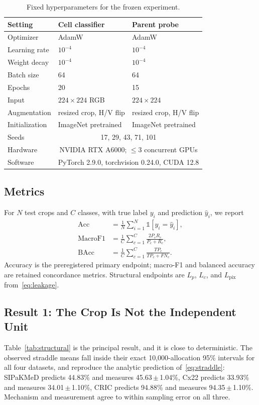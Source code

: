 \documentclass[conference]{IEEEtran}
\newcommand{\meanpm}[2]{#1\,$\pm$\,#2}
\begin{document}
\begin{table}[t]
\caption{Fixed hyperparameters for the frozen experiment.}
\label{tab:hparams}
\centering
\scriptsize
\setlength{\tabcolsep}{3.5pt}
\begin{tabular}{lll}
\toprule
Setting & Cell classifier & Parent probe \\
\midrule
Optimizer & AdamW & AdamW \\
Learning rate & $10^{-4}$ & $10^{-4}$ \\
Weight decay & $10^{-4}$ & $10^{-4}$ \\
Batch size & 64 & 64 \\
Epochs & 20 & 15 \\
Input & $224\times224$ RGB & $224\times224$ \\
Augmentation & resized crop, H/V flip & resized crop, H/V flip \\
Initialization & ImageNet pretrained & ImageNet pretrained \\
Seeds & \multicolumn{2}{c}{17, 29, 43, 71, 101} \\
Hardware & \multicolumn{2}{c}{NVIDIA RTX A6000; $\leq$3 concurrent GPUs} \\
Software & \multicolumn{2}{c}{PyTorch 2.9.0, torchvision 0.24.0, CUDA 12.8} \\
\bottomrule
\end{tabular}
\end{table}

\subsection{Metrics}
For $N$ test crops and $C$ classes, with true label $y_i$ and prediction $\hat y_i$, we report
\begin{align}
\mathrm{Acc}&=\frac{1}{N}\sum_{i=1}^{N}\mathbb{1}[y_i=\hat y_i],\\
\mathrm{MacroF1}&=\frac{1}{C}\sum_{c=1}^{C}\frac{2P_cR_c}{P_c+R_c},\\
\mathrm{BAcc}&=\frac{1}{C}\sum_{c=1}^{C}\frac{TP_c}{TP_c+FN_c}.
\end{align}
Accuracy is the preregistered primary endpoint; macro-F1 and balanced accuracy are retained concordance metrics.
Structural endpoints are $L_p$, $L_c$, and $L_{\mathrm{pix}}$ from~\eqref{eq:leakage}.

\subsection{Result 1: The Crop Is Not the Independent Unit}
Table~\ref{tab:structural} is the principal result, and it is close to deterministic.
The observed straddle means fall inside their exact 10,000-allocation 95\% intervals for all four datasets, and reproduce the analytic prediction of~\eqref{eq:straddle}: SIPaKMeD predicts 44.83\% and measures \meanpm{45.63}{1.04}\%, Cx22 predicts 33.93\% and measures \meanpm{34.01}{1.10}\%, CRIC predicts 94.88\% and measures \meanpm{94.35}{1.10}\%.
Mechanism and measurement agree to within sampling error on all three.
\end{document}
